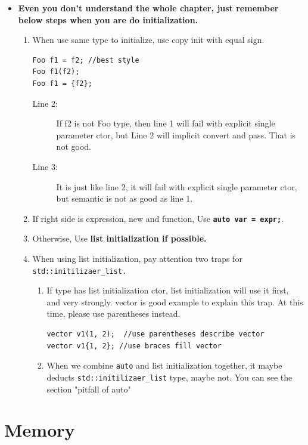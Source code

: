 \documentclass[a4paper,11pt,twoside]{book}
\begin{document}
\begin{itemize}
	\item \textbf{Even you don't understand the whole chapter, just remember below steps when you are do initialization.}
	\begin{enumerate}
		\item When use same type to initialize, use copy init with equal sign.
\begin{lstlisting}
Foo f1 = f2; //best style
Foo f1(f2);  
Foo f1 = {f2}; 
\end{lstlisting}
\begin{description}
	\item[Line 2:] If f2 is not Foo type, then line 1 will fail with explicit single parameter ctor, but Line 2 will implicit convert and pass. That is not good.
	
	\item[Line 3:] It is just like line 2, it will fail with explicit single parameter ctor, but semantic is not as good as line 1.
\end{description}
		\item If right side is expression, new and function, Use \textbf{\texttt{auto var = expr;}}. 
		
		\item Otherwise, Use \textbf{list initialization if possible.} 
		
		\item When using list initialization, pay attention two traps for \texttt{std::initilizaer\_list.} 
		\begin{enumerate}
			\item If type has list initialization ctor, list initialization will use it first, and very strongly. vector is good example to explain this trap. At this time, please use parentheses instead.
\begin{lstlisting}
vector v1(1, 2);  //use parentheses describe vector 
vector v1{1, 2}; //use braces fill vector
\end{lstlisting}
			
			\item When we combine \texttt{auto} and list initialization together, it maybe deducts \texttt{std::initilizaer\_list} type, maybe not.  You can see the section "pitfall of auto" 
		\end{enumerate}
	\end{enumerate}
	
\end{itemize}



\chapter{Memory}
\end{document}
